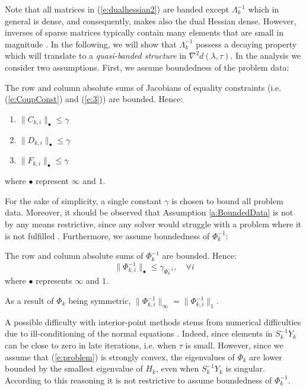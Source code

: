 Note that all matrices in (\ref{e:dualhessian2}) are banded except $\Lambda_k^{-1}$ which in general is dense, and consequently, makes also the dual Hessian dense. However, inverses of sparse matrices typically contain many elements that are small in magnitude \cite{Benzi2002}. In the following, we will show that $\Lambda_k^{-1}$ possess a decaying property which will translate to a \emph{quasi-banded structure} in $\nabla^2 d(\lambda,\tau)$. In the analysis we consider two assumptions. First, we assume boundedness of the problem data:
\begin{assumption} \label{a:BoundedData}
The row and column absolute sums of Jacobians of equality constraints (i.e. (\ref{e:CoupConst}) and (\ref{e:3})) are bounded. Hence:
\begin{enumerate}
\item $\| C_{k,i} \|_\bullet \leq \gamma$
\item $\| D_{k,i} \|_\bullet \leq \gamma$
\item $\| F_{k,i} \|_\bullet \leq \gamma$
\end{enumerate}
where $\bullet$ represent $\infty$ and $1$.
\end{assumption}
For the sake of simplicity, a single constant $\gamma$ is chosen to bound all problem data. Moreover, it should be observed that Assumption \ref{a:BoundedData} is not by any means restrictive, since any solver would struggle with a problem where it is not fulfilled \cite{}.
Furthermore, we assume boundedness of $\Phi_k^{-1}$:
\begin{assumption} \label{a:BoundedConditioning}
The row and column absolute sums of $\Phi_k^{-1}$ are bounded. Hence:
\begin{equation}
\| \Phi_{k,i}^{-1} \|_\bullet \leq \gamma_{\Phi_k^{-1}}, \quad \forall i
\end{equation}
where $\bullet$ represents $\infty$ and $1$.
\end{assumption}
\begin{remark}
As a result of $\Phi_k$ being symmetric, $\| \Phi_{k,i}^{-1} \|_\infty = \| \Phi_{k,i}^{-1} \|_1$.
\end{remark}
\begin{remark}
A possible difficulty with interior-point methods stems from numerical difficulties due to ill-conditioning of the normal equations \cite{WrightM1998}. Indeed, since elements in $S_k^{-1}Y_k$ can be close to zero in late iterations, i.e. when $\tau$ is small. However, since we assume that (\ref{e:problem}) is strongly convex, the eigenvalues of $\Phi_k$ are lower bounded by the smallest eigenvalue of $H_k$, even when $S_k^{-1}Y_k$ is singular. According to this reasoning it is not restrictive to assume boundedness of $\Phi_k^{-1}$.
\end{remark}

